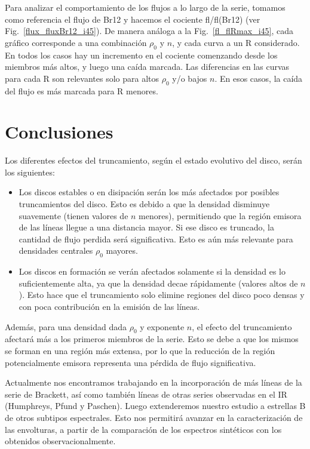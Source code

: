 \documentclass[baaa]{baaa}
\begin{document}
Para analizar el comportamiento de los flujos a lo largo de la serie, tomamos como referencia el flujo de Br12 y hacemos el cociente fl/fl(Br12) (ver Fig.~\ref{flux_fluxBr12_i45}). De manera an\'aloga a la Fig.~\ref{fl_flRmax_i45}, cada gr\'afico corresponde a una combinaci\'on $\rho_0$ y $n$, y cada curva a un R considerado. En todos los casos hay un incremento en el cociente comenzando desde los miembros m\'as altos, y luego una ca\'ida marcada. Las diferencias en las curvas para cada R son relevantes solo para altos $\rho_0$ y/o bajos $n$. En esos casos, la ca\'ida del flujo es m\'as marcada para R menores. 


\section{Conclusiones}

Los diferentes efectos del truncamiento, seg\'un el estado evolutivo del disco, ser\'an los siguientes:

\begin{itemize}
\item Los discos estables o en disipaci\'on ser\'an los m\'as afectados por posibles truncamientos del disco. Esto es debido a que la densidad disminuye suavemente (tienen valores de $n$ menores), permitiendo que la regi\'on emisora de las l\'ineas llegue a una distancia mayor. Si ese disco es truncado, la cantidad de flujo perdida ser\'a significativa. Esto es a\'un m\'as relevante para densidades centrales $\rho_0$ mayores. 
\item Los discos en formaci\'on se ver\'an afectados solamente si la densidad es lo suficientemente alta, ya que la densidad decae r\'apidamente (valores altos de $n$). Esto hace que el truncamiento solo elimine regiones del disco poco densas y con poca contribuci\'on en la emisi\'on de las l\'ineas.
\end{itemize}

Adem\'as, para una densidad dada $\rho_0$ y exponente $n$, el efecto del truncamiento afectar\'a m\'as a los primeros miembros de la serie. Esto se debe a que los mismos se forman en una regi\'on m\'as extensa, por lo que la reducci\'on de la regi\'on potencialmente emisora representa una p\'erdida de flujo significativa. 

Actualmente nos encontramos trabajando en la incorporaci\'on de m\'as l\'ineas de la serie de Brackett, as\'i como tambi\'en l\'ineas de otras series observadas en el IR (Humphreys, Pfund y Paschen). Luego extenderemos nuestro estudio a estrellas B de otros subtipos espectrales. Esto nos permitir\'a avanzar en la caracterizaci\'on de las envolturas, a partir de la comparaci\'on de los espectros sint\'eticos con los obtenidos observacionalmente.
\end{document}
